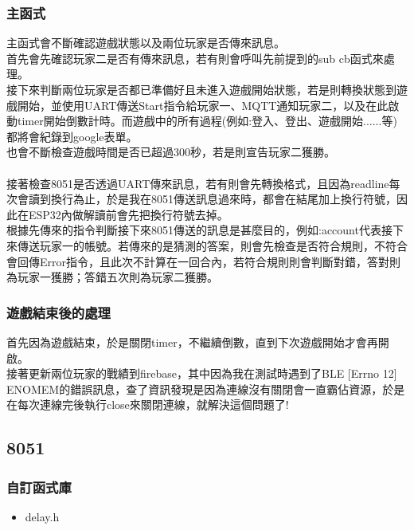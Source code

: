 \documentclass{scrartcl}
\begin{document}
\subsubsection{主函式}

主函式會不斷確認遊戲狀態以及兩位玩家是否傳來訊息。\\
首先會先確認玩家二是否有傳來訊息，若有則會呼叫先前提到的sub cb函式來處理。\\
接下來判斷兩位玩家是否都已準備好且未進入遊戲開始狀態，若是則轉換狀態到遊戲開始，並使用UART傳送Start指令給玩家一、MQTT通知玩家二，以及在此啟動timer開始倒數計時。而遊戲中的所有過程(例如:登入、登出、遊戲開始......等)都將會紀錄到google表單。\\
也會不斷檢查遊戲時間是否已超過300秒，若是則宣告玩家二獲勝。\\\\
接著檢查8051是否透過UART傳來訊息，若有則會先轉換格式，且因為readline每次會讀到換行為止，於是我在8051傳送訊息過來時，都會在結尾加上換行符號，因此在ESP32內做解讀前會先把換行符號去掉。\\
根據先傳來的指令判斷接下來8051傳送的訊息是甚麼目的，例如:account代表接下來傳送玩家一的帳號。若傳來的是猜測的答案，則會先檢查是否符合規則，不符合會回傳Error指令，且此次不計算在一回合內，若符合規則則會判斷對錯，答對則為玩家一獲勝；答錯五次則為玩家二獲勝。

\subsubsection{遊戲結束後的處理}

首先因為遊戲結束，於是關閉timer，不繼續倒數，直到下次遊戲開始才會再開啟。\\
接著更新兩位玩家的戰績到firebase，其中因為我在測試時遇到了BLE [Errno 12] ENOMEM的錯誤訊息，查了資訊發現是因為連線沒有關閉會一直霸佔資源，於是在每次連線完後執行close來關閉連線，就解決這個問題了!

\subsection{8051}

\subsubsection{自訂函式庫}
\begin{itemize}
\item delay.h
\end{itemize}


\end{document}
